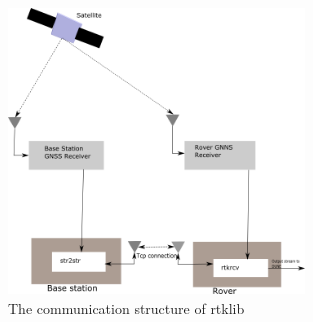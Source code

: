 \begin{figure}[H]
	\centering
		\includegraphics[width=0.7\textwidth]{figs/Rtklib_structure.png}
		\caption{The communication structure of \gls{rtklib}}
		\label{figure:RTKLIB_STRUCTURE}
\end{figure}

